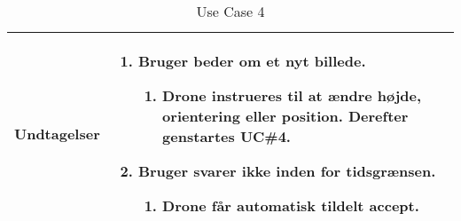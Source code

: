 \begin{table}[H]
\begin{tabular}{| p{3cm}| p{11.5cm}|}
Undtagelser							& 

									\renewcommand{\labelenumi}{\Roman{enumi}:}
									\renewcommand{\labelenumii}{\alph{enumii})}
									\begin{enumerate}[topsep=0.0cm,leftmargin=0.5cm]
										\item Bruger beder om et nyt billede.
											\begin{enumerate}[topsep=0cm, leftmargin=1cm]
												\item Drone instrueres til at ændre højde, orientering eller position. Derefter genstartes UC\#4.
											\end{enumerate}
										\item Bruger svarer ikke inden for tidsgrænsen.
											\begin{enumerate}[topsep=0cm, leftmargin=1cm]
												\item Drone får automatisk tildelt accept.
											\end{enumerate}
									\end{enumerate} \\\hline	

\end{tabular}
\caption{Use Case 4}
\label{tab:UC4}
\end{table}